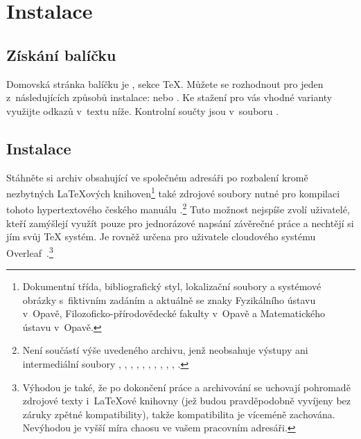 
\chapter{Instalace}\label{install}%

\section{Získání balíčku \ipotname{}}\label{instgetpack}%

Domovská stránka balíčku \pkg{\ipotname} je \theshome, sekce \TeX. Můžete se
rozhodnout pro jeden z~následujících způsobů instalace:  nebo
. Ke stažení pro vás vhodné varianty
využijte odkazů v~textu níže. Kontrolní součty jsou v~souboru
\href{https://is.slu.cz/www/hle0002/vyuka/aid/ipothes/CHECKSUMS.md5}%
{}.

\section{Instalace }\label{installinone}%

Stáhněte si archiv
\href{https://is.slu.cz/www/hle0002/vyuka/aid/ipothes/vzorova\_prace.ipothes.zip}%
{} obsahující ve společném adresáři
 po rozbalení kromě nezbytných \LaTeX ových
knihoven\footnote{Dokumentní třída, bibliografický styl, lokalizační soubory a
  systémové obrázky s~fiktivním zadáním a aktuálně se znaky Fyzikálního ústavu
  v~Opavě, Fi\-lo\-zo\-fic\-ko-pří\-ro\-do\-vě\-dec\-ké fakulty v~Opavě a
  Matematického ústavu v~Opavě.} také zdrojové soubory nutné pro kompilaci
tohoto hypertextového českého manuálu
\href{https://is.slu.cz/www/hle0002/vyuka/aid/ipothes/vzorova\_prace.pdf}%
{}.\footnote{Není součástí výše uvedeného archivu, jenž
  neobsahuje výstupy ani intermediální soubory , ,
  , , , , ,
  , , , .} Tuto možnost nejspíše
zvolí uživatelé, kteří zamýšlejí využít \pkg{\ipotname} pouze pro jednorázové
napsání závěrečné práce a nechtějí si jím  svůj \TeX{}
systém. Je rovněž určena pro uživatele cloudového systému
Overleaf~\cite{Ovr:LIVE::Overleaf}.\footnote{Výhodou je také, že po dokončení
  práce a archivování se uchovají pohromadě zdrojové texty i~\LaTeX ové
  knihovny (jež budou pravděpodobně vyvíjeny bez záruky zpětné kompatibility),
  takže kompatibilita je víceméně zachována. Nevýhodou je vyšší míra chaosu ve
  vašem pracovním adresáři.}

